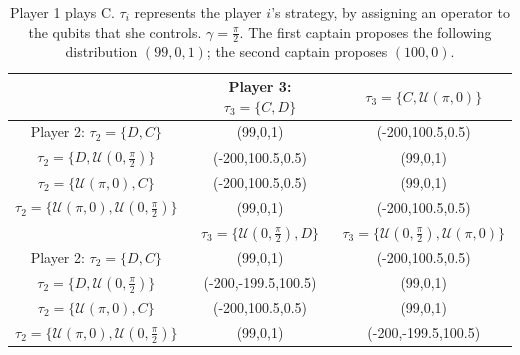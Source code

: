

\begin{center}
\begin{table}
\begin{centering}
\begin{tabular}{ccc}
\hline 
 & Player 3: $\tau_{3}=\{C,D\}$ &  $\tau_{3}=\{C,\mathcal{U}(\pi,0)\}$\tabularnewline
\hline 
Player 2: $\tau_{2}=\{D,C\}$ & (99,0,1) & (-200,100.5,0.5)\tabularnewline
$\tau_{2}=\{D,\mathcal{U}(0,\frac{\pi}{2})\}$ & (-200,100.5,0.5) & (99,0,1)\tabularnewline
$\tau_{2}=\{\mathcal{U}(\pi,0),C\}$ & (-200,100.5,0.5) & (99,0,1)\tabularnewline
$\tau_{2}=\{\mathcal{U}(\pi,0),\mathcal{U}(0,\frac{\pi}{2})\}$ & (99,0,1) & (-200,100.5,0.5)\tabularnewline
\hline 
\hline 
 & $\tau_{3}=\{\mathcal{U}(0,\frac{\pi}{2}),D\}$ & $\tau_{3}=\{\mathcal{U}(0,\frac{\pi}{2}),\mathcal{U}(\pi,0)\}$\tabularnewline
Player 2: $\tau_{2}=\{D,C\}$ & (99,0,1) & (-200,100.5,0.5)\tabularnewline
$\tau_{2}=\{D,\mathcal{U}(0,\frac{\pi}{2})\}$ & (-200,-199.5,100.5) & (99,0,1)\tabularnewline
$\tau_{2}=\{\mathcal{U}(\pi,0),C\}$ & (-200,100.5,0.5) & (99,0,1)\tabularnewline
$\tau_{2}=\{\mathcal{U}(\pi,0),\mathcal{U}(0,\frac{\pi}{2})\}$ & (99,0,1) & (-200,-199.5,100.5)\tabularnewline
\end{tabular}
\par\end{centering}
\caption{Player 1 plays C. $\tau_{i}$ represents the player $i$'s strategy, by assigning an operator to the qubits that she controls. $\gamma=\frac{\pi}{2}$. The first captain proposes the following distribution $(99,0,1)$; the second captain proposes $(100,0)$. }
\label{iamlivingontheedge}
\end{table}

\par\end{center}


